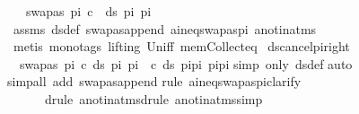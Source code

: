 \begin{isabellebody}
\ \ \ {\isachardoublequoteopen}{\isacharparenleft}{\kern0pt}swapas\ pi\ c\ {\isasymin}\ ds\ pi{}\ pi{}{\isacharparenright}{\kern0pt}{\isachardoublequoteclose}\isanewline
%
\isadelimproof
\ \ %
\endisadelimproof
%
\isatagproof
{}\isamarkupfalse%
\ assms\ ds{\isacharunderscore}{\kern0pt}def\ swapas{\isacharunderscore}{\kern0pt}append\ a{\isacharunderscore}{\kern0pt}ineq{\isacharunderscore}{\kern0pt}swapas{\isacharunderscore}{\kern0pt}pi\ a{\isacharunderscore}{\kern0pt}not{\isacharunderscore}{\kern0pt}in{\isacharunderscore}{\kern0pt}atms\isanewline
\ \ \isamarkupfalse%
\ {\isacharparenleft}{\kern0pt}metis\ {\isacharparenleft}{\kern0pt}mono{\isacharunderscore}{\kern0pt}tags{\isacharcomma}{\kern0pt}\ lifting{\isacharparenright}{\kern0pt}\ Un{\isacharunderscore}{\kern0pt}iff\ mem{\isacharunderscore}{\kern0pt}Collect{\isacharunderscore}{\kern0pt}eq{\isacharparenright}{\kern0pt}%
\endisatagproof
{\isafoldproof}%
%
\isadelimproof
\isanewline
%
\endisadelimproof
\isanewline
\isanewline
\isanewline
{}\isamarkupfalse%
\ ds{\isacharunderscore}{\kern0pt}cancel{\isacharunderscore}{\kern0pt}pi{\isacharunderscore}{\kern0pt}right{\isacharcolon}{\kern0pt}\ \isanewline
\ \ {\isachardoublequoteopen}{\isacharparenleft}{\kern0pt}swapas\ pi\ c{\isasymin}\ ds\ pi{}\ pi{}{\isacharparenright}{\kern0pt}\ {\isasymLongrightarrow}\ {\isacharparenleft}{\kern0pt}c{\isasymin}\ ds\ {\isacharparenleft}{\kern0pt}pi{}{\isacharat}{\kern0pt}pi{\isacharparenright}{\kern0pt}\ {\isacharparenleft}{\kern0pt}pi{}{\isacharat}{\kern0pt}pi{\isacharparenright}{\kern0pt}{\isacharparenright}{\kern0pt}{\isachardoublequoteclose}\isanewline
%
\isadelimproof
%
\endisadelimproof
%
\isatagproof
{}\isamarkupfalse%
{\isacharparenleft}{\kern0pt}simp\ only{\isacharcolon}{\kern0pt}\ ds{\isacharunderscore}{\kern0pt}def{\isacharparenright}{\kern0pt}\isanewline
{}\isamarkupfalse%
{\isacharparenleft}{\kern0pt}auto{\isacharparenright}{\kern0pt}\isanewline
{}\isamarkupfalse%
{\isacharparenleft}{\kern0pt}simp{\isacharunderscore}{\kern0pt}all\ add{\isacharcolon}{\kern0pt}\ swapas{\isacharunderscore}{\kern0pt}append{\isacharparenright}{\kern0pt}\isanewline
{}\isamarkupfalse%
{\isacharparenleft}{\kern0pt}rule\ a{\isacharunderscore}{\kern0pt}ineq{\isacharunderscore}{\kern0pt}swapas{\isacharunderscore}{\kern0pt}pi{\isacharcomma}{\kern0pt}clarify{\isacharcomma}{\kern0pt}\isanewline
\ \ \ \ \ \ drule\ a{\isacharunderscore}{\kern0pt}not{\isacharunderscore}{\kern0pt}in{\isacharunderscore}{\kern0pt}atms{\isacharcomma}{\kern0pt}drule\ a{\isacharunderscore}{\kern0pt}not{\isacharunderscore}{\kern0pt}in{\isacharunderscore}{\kern0pt}atms{\isacharcomma}{\kern0pt}simp{\isacharparenright}{\kern0pt}{\isacharplus}{\kern0pt}\isanewline

\end{isabellebody}
